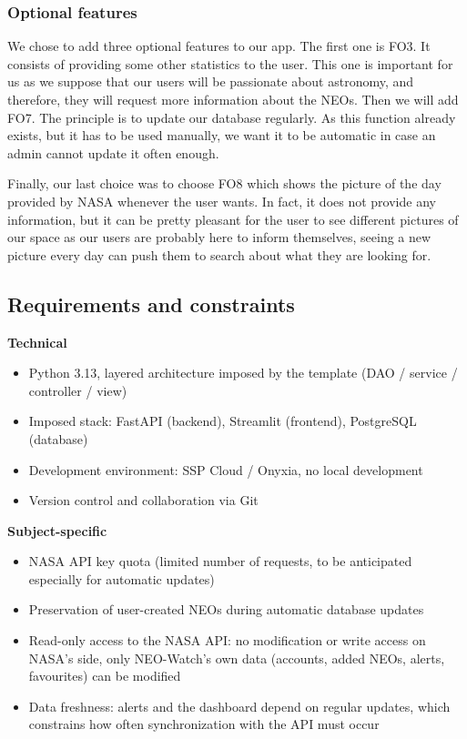\subsubsection{Optional features}

We chose to add three optional features to our app. The first one is FO3. It consists of providing some other statistics to the user. This one is important for us as we suppose that our users will be passionate about astronomy, and therefore, they will request more information about the NEOs.
Then we will add FO7. The principle is to update our database regularly. As this function already exists, but it has to be used manually, we want it to be automatic in case an admin cannot update it often enough.



Finally, our last choice was to choose FO8 which shows the picture of the day provided by NASA whenever the user wants. In fact, it does not provide any information, but it can be pretty pleasant for the user to see different pictures of our space as our users are probably here to inform themselves, seeing a new picture every day can push them to search about what they are looking for.

\subsection{Requirements and constraints}

\textbf{Technical}

\begin{itemize}
  \item Python 3.13, layered architecture imposed by the template (DAO / service / controller / view)
  \item Imposed stack: FastAPI (backend), Streamlit (frontend), PostgreSQL (database)
  \item Development environment: SSP Cloud / Onyxia, no local development
  \item Version control and collaboration via Git
\end{itemize}

\vspace{0.25cm}

\textbf{Subject-specific}

\begin{itemize}
  \item NASA API key quota (limited number of requests, to be anticipated especially for automatic updates)
  \item Preservation of user-created NEOs during automatic database updates
  \item Read-only access to the NASA API: no modification or write access on NASA's side, only NEO-Watch's own data (accounts, added NEOs, alerts, favourites) can be modified
  \item Data freshness: alerts and the dashboard depend on regular updates, which constrains how often synchronization with the API must occur
\end{itemize}
